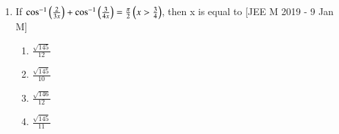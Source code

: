 \documentclass[journal,12pt,twocolumn]{IEEEtran}
\theoremstyle{remark}
\begin{document}
\begin{enumerate}
{	}
	\item{
			If $\cos^{-1}\left(\frac{2}{3x}\right) + \cos^{-1}\left(\frac{3}{4x}\right) = \frac{\pi}{2} \left(x > \frac{3}{4}\right)$, then x is equal to \hfill [JEE M 2019 - 9 Jan M]
		\begin{multicols}{2}
		\begin{enumerate}
			\item{$\frac{\sqrt{145}}{12}$}\\
			\item{$\frac{\sqrt{145}}{10}$}
			\columnbreak
			\item{$\frac{\sqrt{146}}{12}$}\\
			\item{$\frac{\sqrt{145}}{11}$}
		\end{enumerate}
		\end{multicols}
	}
\end{enumerate}
\end{document}
